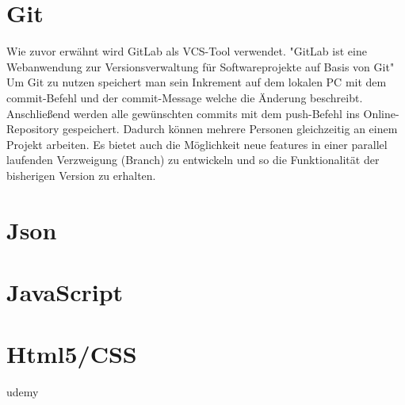 \section{Git}
Wie zuvor erw\"ahnt wird GitLab als VCS-Tool verwendet. "GitLab ist eine Webanwendung zur Versionsverwaltung f\"ur Softwareprojekte auf Basis von Git"\footnotemark {} 
Um Git zu nutzen speichert man sein Inkrement auf dem lokalen PC mit dem commit-Befehl und der commit-Message welche die \"Anderung beschreibt. Anschlie\ss{}end werden alle gew\"unschten commits mit dem push-Befehl ins Online-Repository gespeichert. Dadurch k\"onnen mehrere Personen gleichzeitig an einem Projekt arbeiten. Es bietet auch die M\"oglichkeit neue features in einer parallel laufenden Verzweigung (Branch) zu entwickeln und so die Funktionalit\"at der bisherigen Version zu erhalten. 



\section{Json}
\section{JavaScript}
\section{Html5/CSS}

udemy

